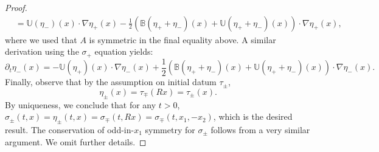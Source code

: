 \documentclass[11pt,reqno]{amsproc}
\newcommand{\na}{\nabla}
\newcommand{\B}{\mathbb{B}}
\newcommand{\U}{\mathbb{U}}
\newcommand{\p}{\partial}
\newcommand{\pt}{\p_t}
\begin{document}
\begin{proof}
\begin{align*}
        &= \U(\eta_-)(x) \cdot\na \eta_+(x) - \frac12 \left(\B(\eta_+ + \eta_-)(x) + \U(\eta_+ + \eta_-)(x)\right) \cdot \nabla \eta_+(x),
    \end{align*}
    where we used that $A$ is symmetric in the final equality above. A similar derivation using the $\sigma_+$ equation yields:
    $$
    \pt \eta_-(x) = -\U(\eta_+)(x) \cdot\na \eta_-(x) + \frac12 \left(\B(\eta_+ + \eta_-)(x) + \U(\eta_+ + \eta_-)(x)\right) \cdot \nabla \eta_-(x).
    $$
    Finally, observe that by the assumption on initial datum $\tau_\pm$,
    $$
    \eta_\pm (x) = \tau_\mp(Rx) = \tau_\pm (x).
    $$
    By uniqueness, we conclude that for any $t > 0$, $\sigma_\pm (t,x) = \eta_\pm(t,x) = \sigma_\mp(t, Rx) = \sigma_\mp (t, x_1,-x_2)$, which is the desired result. The conservation of odd-in-$x_1$ symmetry for $\sigma_\pm$ follows from a very similar argument. We omit further details.
\end{proof}
\end{document}
